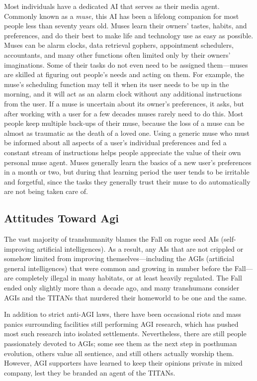 Most individuals have a dedicated AI that serves as 
their media agent. Commonly known as a \textit{muse,} this 
AI has been a lifelong companion for most people 
less than seventy years old. Muses learn their owners' 
tastes, habits, and preferences, and do their best to 
make life and technology use as easy as possible. 
Muses can be alarm clocks, data retrieval gophers, 
appointment schedulers, accountants, and many other 
functions often limited only by their owners' imaginations. Some of their tasks do not even need to be assigned them—muses are skilled at figuring out people's 
needs and acting on them. For example, the muse's 
scheduling function may tell it when its user needs to 
be up in the morning, and it will act as an alarm clock 
without any additional instructions from the user. If a 
muse is uncertain about its owner's preferences, it asks, 
but after working with a user for a few decades muses 
rarely need to do this. Most people keep multiple 
back-ups of their muse, because the loss of a muse 
can be almost as traumatic as the death of a loved one. 
Using a generic muse who must be informed about 
all aspects of a user's individual preferences and fed a 
constant stream of instructions helps people appreciate the value of their own personal muse agent. Muses 
generally learn the basics of a new user's preferences 
in a month or two, but during that learning period the 
user tends to be irritable and forgetful, since the tasks 
they generally trust their muse to do automatically are 
not being taken care of.

\subsection{Attitudes Toward Agi}

The vast majority of transhumanity blames the Fall on 
rogue seed AIs (self-improving artificial intelligences). 
As a result, any AIs that are not crippled or somehow limited from improving themselves—including 
the AGIs (artificial general intelligences) that were 
common and growing in number before the Fall—are 
completely illegal in many habitats, or at least heavily 
regulated. The Fall ended only slightly more than a 
decade ago, and many transhumans consider AGIs 
and the TITANs that murdered their homeworld to 
be one and the same. 

In addition to strict anti-AGI laws, there have been 
occasional riots and mass panics surrounding facilities still performing AGI research, which has pushed 
most such research into isolated settlements. Nevertheless, there are still people passionately devoted to 
AGIs; some see them as the next step in posthuman 
evolution, others value all sentience, and still others 
actually worship them. However, AGI supporters have 
learned to keep their opinions private in mixed company, lest they be branded an agent of the TITANs.

